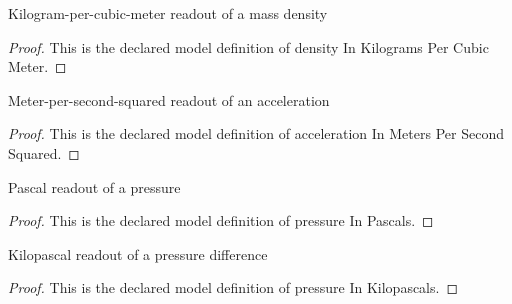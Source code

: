 \begin{definition}
  \label{def:physics:phyx-mini-0391:phyxminiproblems-problemphyxmini0391-densityinkilogramspercubicmeter}
  Kilogram-per-cubic-meter readout of a mass density
\end{definition}
\begin{proof}
  This is the declared model definition of density In Kilograms Per Cubic Meter.
\end{proof}
\begin{definition}
  \label{def:physics:phyx-mini-0391:phyxminiproblems-problemphyxmini0391-accelerationinmeterspersecondsquared}
  Meter-per-second-squared readout of an acceleration
\end{definition}
\begin{proof}
  This is the declared model definition of acceleration In Meters Per Second Squared.
\end{proof}
\begin{definition}
  \label{def:physics:phyx-mini-0391:phyxminiproblems-problemphyxmini0391-pressureinpascals}
  Pascal readout of a pressure
\end{definition}
\begin{proof}
  This is the declared model definition of pressure In Pascals.
\end{proof}
\begin{definition}
  \label{def:physics:phyx-mini-0391:phyxminiproblems-problemphyxmini0391-pressureinkilopascals}
  Kilopascal readout of a pressure difference
\end{definition}
\begin{proof}
  This is the declared model definition of pressure In Kilopascals.
\end{proof}
